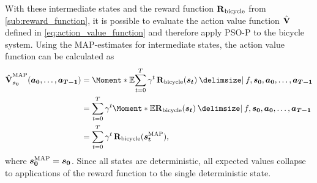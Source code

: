With these intermediate states and the reward function $\operatorname{\operatorname{\mathbf{R}}_{\text{bicycle}}}$ from \cref{sub:reward_function}, it is possible to evaluate the action value function $\operatorname{\hat{\operatorname{\mathbf{V}}}}$ defined in \cref{eq:action_value_function} and therefore apply PSO-P to the bicycle system.
Using the MAP-estimates for intermediate states, the action value function can be calculated as
\begin{align}
    \label{eq:map_action_value_function}
    \begin{split}
        \map{\AVlu}_{\mat{s_0}}(\mat{a_0}, \dots, \mat{a_{T-1}}) &= \Moment*{\E}{\sum_{t=0}^T \gamma^t \RwdBicycle(\mat{s_t}) \given f, \mat{s_0}, \mat{a_0}, \dots, \mat{a_{T-1}}} \\
        &= \sum_{t=0}^T \gamma^t \Moment*{\E}{\RwdBicycle(\mat{s_t}) \given f, \mat{s_0}, \mat{a_0}, \dots, \mat{a_{T-1}}} \\
        &= \sum_{t=0}^T \gamma^t \RwdBicycle(\map{\mat{s_t}}),
    \end{split}
\end{align}
where $\bm{s_0}^{\text{MAP}} = \bm{s_0}$.
Since all states are deterministic, all expected values collapse to applications of the reward function to the single deterministic state.

